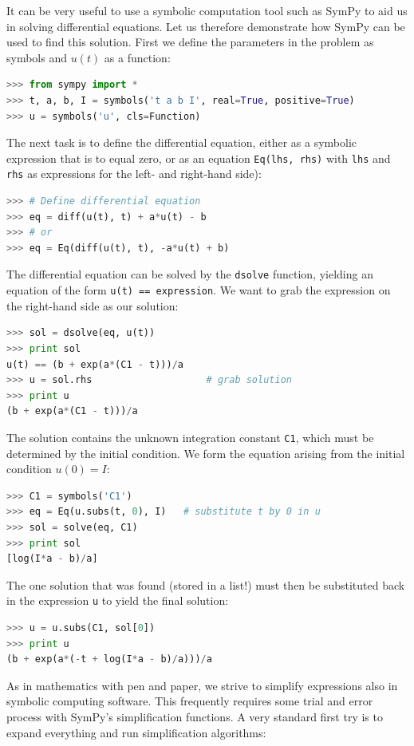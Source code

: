 \documentclass[graybox,envcountchap,sectrefs,final]{svmonodo}
\newenvironment{notice_mdfboxadmon}[1][]{
\begin{notice_mdfboxmdframed}[frametitle=#1]
}
{
\end{notice_mdfboxmdframed}
}
\begin{document}
\begin{notice_mdfboxadmon}
It can be very useful to use a symbolic computation tool such as SymPy
to aid us in solving differential equations.
Let us therefore demonstrate how SymPy can be used to find this solution.
First we define the parameters in the problem as symbols
and $u(t)$ as a function:

\begin{lstlisting}[language=Python,style=graycolor]
>>> from sympy import *
>>> t, a, b, I = symbols('t a b I', real=True, positive=True)
>>> u = symbols('u', cls=Function)
\end{lstlisting}
The next task is to define the differential equation, either as
a symbolic expression that is to equal zero, or as
an equation \texttt{Eq(lhs, rhs)} with \texttt{lhs} and \texttt{rhs} as expressions for
the left- and right-hand side):

\begin{lstlisting}[language=Python,style=graycolor]
>>> # Define differential equation
>>> eq = diff(u(t), t) + a*u(t) - b
>>> # or
>>> eq = Eq(diff(u(t), t), -a*u(t) + b)
\end{lstlisting}
The differential equation can be solved by the \texttt{dsolve} function, yielding
an equation of the form \texttt{u(t) == expression}. We want to grab the
expression on the right-hand side as our solution:

\begin{lstlisting}[language=Python,style=graycolor]
>>> sol = dsolve(eq, u(t))
>>> print sol
u(t) == (b + exp(a*(C1 - t)))/a
>>> u = sol.rhs                    # grab solution
>>> print u
(b + exp(a*(C1 - t)))/a
\end{lstlisting}
The solution contains the unknown integration constant \texttt{C1}, which must
be determined by the initial condition. We form the equation arising
from the initial condition $u(0)=I$:

\begin{lstlisting}[language=Python,style=graycolor]
>>> C1 = symbols('C1')
>>> eq = Eq(u.subs(t, 0), I)   # substitute t by 0 in u
>>> sol = solve(eq, C1)
>>> print sol
[log(I*a - b)/a]
\end{lstlisting}
The one solution that was found (stored in a list!)
must then be substituted back in the
expression \texttt{u} to yield the final solution:

\begin{lstlisting}[language=Python,style=graycolor]
>>> u = u.subs(C1, sol[0])
>>> print u
(b + exp(a*(-t + log(I*a - b)/a)))/a
\end{lstlisting}
As in mathematics with pen and paper, we strive to simplify
expressions also in symbolic computing software.
This frequently requires some trial and error
process with SymPy's simplification functions. A very standard
first try is to expand everything and run simplification algorithms:


\end{notice_mdfboxadmon}
\end{document}
